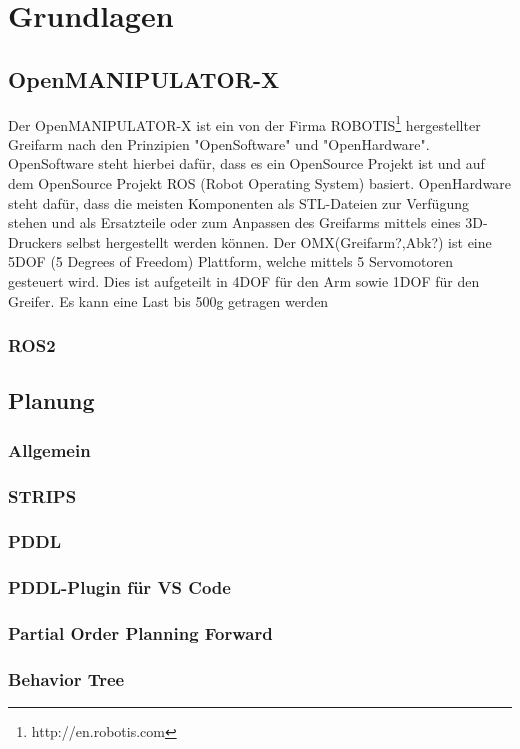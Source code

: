 \chapter {Grundlagen}
\section{OpenMANIPULATOR-X}
Der OpenMANIPULATOR-X ist ein von der Firma ROBOTIS{\footnote{http://en.robotis.com}} hergestellter Greifarm nach den Prinzipien "OpenSoftware" und "OpenHardware". OpenSoftware steht hierbei dafür, dass es ein OpenSource Projekt ist und auf dem OpenSource Projekt ROS (Robot Operating System) basiert. OpenHardware steht dafür, dass die meisten Komponenten als STL-Dateien zur Verfügung stehen und als Ersatzteile oder zum Anpassen des Greifarms mittels eines 3D-Druckers selbst hergestellt werden können. \newline
Der OMX(Greifarm?,Abk?) ist eine 5DOF (5 Degrees of Freedom) Plattform, welche mittels 5 Servomotoren gesteuert wird. Dies ist aufgeteilt in 4DOF für den Arm sowie 1DOF für den Greifer.
Es kann eine Last bis 500g getragen werden
\subsection{ROS2}
\section {Planung}
\subsection{Allgemein}
\subsection{STRIPS}
\subsection{PDDL}
\subsection{PDDL-Plugin für VS Code}
\subsection{Partial Order Planning Forward}
\subsection{Behavior Tree}

\newpage